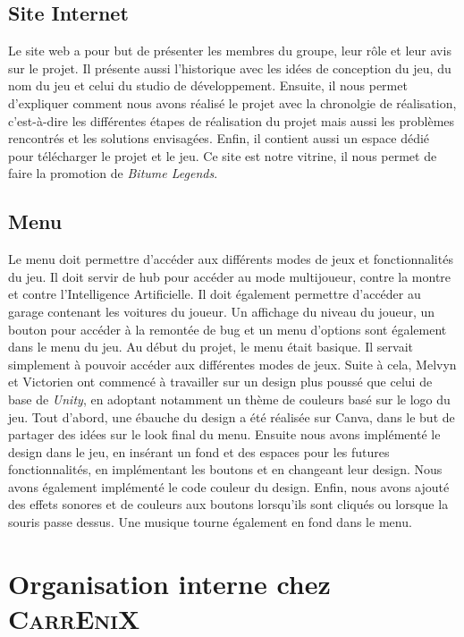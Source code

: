 \documentclass[12pt,a4paper]{article}
\newcommand{\btmlgs}{\textsl{Bitume Legends}}
\newcommand{\AI}{Intelligence Artificielle}
\newcommand{\CEX}{\textsc{CarrEniX}}
\begin{document}
    \subsection{Site Internet}
        Le site web a pour but de présenter les membres du groupe, leur rôle et leur avis sur le projet.
        Il présente aussi l'historique avec les idées de conception du jeu, du nom du jeu et celui du studio
        de développement. Ensuite, il nous permet d'expliquer comment nous avons réalisé le projet avec la
        chronolgie de réalisation, c'est-à-dire les différentes étapes de réalisation du projet mais aussi
        les problèmes rencontrés et les solutions envisagées. Enfin, il contient aussi
        un espace dédié pour télécharger le projet et le jeu. Ce site est notre vitrine, il nous permet de faire
        la promotion de \btmlgs.
  
  
  
    \subsection{Menu}
        Le menu doit permettre d'accéder aux différents modes de jeux et fonctionnalités du jeu.
        Il doit servir de hub pour accéder au mode multijoueur, contre la montre et contre l'\AI.
        Il doit également permettre d'accéder au garage contenant les voitures du joueur. Un affichage
        du niveau du joueur, un bouton pour accéder à la remontée de bug et un menu d'options 
        sont également dans le menu du jeu. Au début du projet, le menu était basique. Il servait 
        simplement à pouvoir accéder aux différentes modes de jeux. Suite à cela, Melvyn et Victorien 
        ont commencé à travailler sur un design plus poussé que celui de base de \textsl{Unity}, 
        en adoptant notamment un thème de couleurs basé sur le logo du jeu. Tout d'abord, une
        ébauche du design a été réalisée sur Canva, dans le but de partager des idées sur le look
        final du menu. Ensuite nous avons implémenté le design dans le jeu, en insérant un fond
        et des espaces pour les futures fonctionnalités, en implémentant les boutons et en changeant
        leur design. Nous avons également implémenté le code couleur du design. Enfin, nous avons 
        ajouté des effets sonores et de couleurs aux boutons lorsqu'ils sont cliqués ou lorsque
        la souris passe dessus. Une musique tourne également en fond dans le menu.

\clearpage

\section{Organisation interne chez \CEX}
\end{document}
